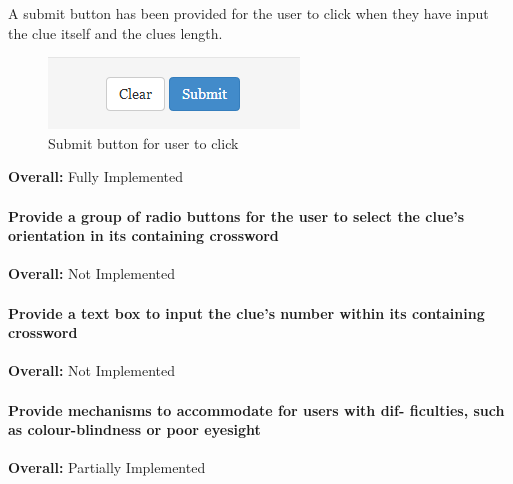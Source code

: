 A submit button has been provided for the user to click when they have input 
the clue itself and the clues length. 

\begin{figure}[H]
	\centering
	\includegraphics[keepaspectratio=true]{evidence/submit.png}
	\caption{Submit button for user to click}
\end{figure}

{\bf Overall:} Fully Implemented

\paragraph{Provide a group of radio buttons for the user to select
the clue's orientation in its containing crossword}

{\bf Overall:} Not Implemented

\paragraph{Provide a text box to input the clue's number within its
containing crossword}
 
{\bf Overall:} Not Implemented

\paragraph{Provide mechanisms to accommodate for users with dif-
ficulties, such as colour-blindness or poor eyesight}
    
{\bf Overall:} Partially Implemented